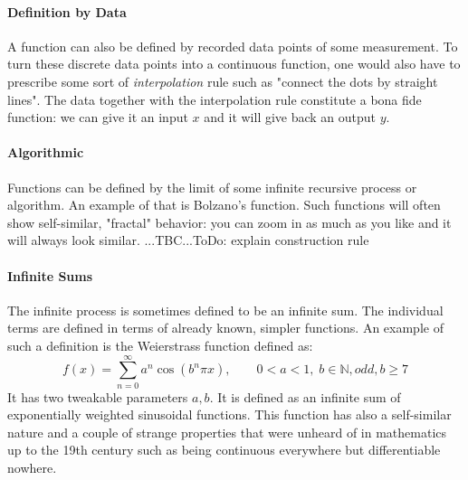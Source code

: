 \paragraph{Definition by Data}
A function can also be defined by recorded data points of some measurement. To turn these discrete data points into a continuous function, one would also have to prescribe some sort of \emph{interpolation} rule such as "connect the dots by straight lines". The data together with the interpolation rule constitute a bona fide function: we can give it an input $x$ and it will give back an output $y$. 

\paragraph{Algorithmic}
Functions can be defined by the limit of some infinite recursive process or algorithm. An example of that is Bolzano's function. Such functions will often show self-similar, "fractal" behavior: you can zoom in as much as you like and it will always look similar. 
...TBC...ToDo: explain construction rule

\paragraph{Infinite Sums}
The infinite process is sometimes defined to be an infinite sum. The individual terms are defined in terms of already known, simpler functions. An example of such a definition is the Weierstrass function defined as:
\begin{equation}
f(x) = \sum_{n=0}^\infty a^n \cos(b^n \pi x), 
\qquad 0 < a < 1, \; b \in \mathbb{N}, odd, b \geq 7
\end{equation}
It has two tweakable parameters $a,b$. It is defined as an infinite sum of exponentially weighted sinusoidal functions. This function has also a self-similar nature and a couple of strange properties that were unheard of in mathematics up to the 19th century such as being continuous everywhere but differentiable nowhere.

